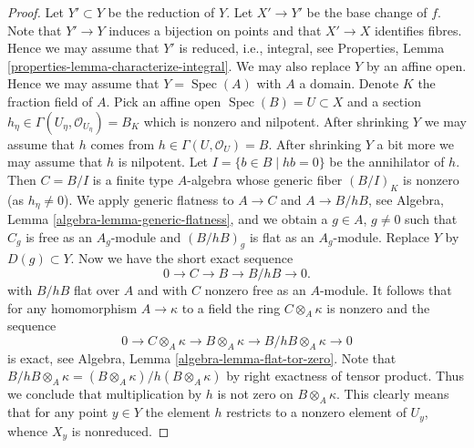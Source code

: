 \documentclass[10pt,a4paper]{amsart}
\theoremstyle{plain}
\theoremstyle{definition}
\theoremstyle{remark}
\numberwithin{equation}{subsection}
\def\Spec{\mathop{\mathrm{Spec}}}
\begin{document}
\begin{proof}
Let $Y' \subset Y$ be the reduction of $Y$. Let $X' \to Y'$
be the base change of $f$. Note that $Y' \to Y$
induces a bijection on points and that $X' \to X$ identifies fibres.
Hence we may assume that $Y'$ is reduced, i.e., integral, see
Properties, Lemma \ref{properties-lemma-characterize-integral}.
We may also replace $Y$ by an affine open. Hence we may assume that
$Y = \Spec(A)$ with $A$ a domain. Denote $K$ the
fraction field of $A$.
Pick an affine open $\Spec(B) = U \subset X$ and a section
$h_\eta \in \Gamma(U_\eta, \mathcal{O}_{U_\eta}) = B_K$
which is nonzero and nilpotent.
After shrinking $Y$ we may assume that $h$ comes from
$h \in \Gamma(U, \mathcal{O}_U) = B$. After shrinking $Y$ a bit
more we may assume that $h$ is nilpotent. Let
$I = \{b \in B \mid hb = 0\}$ be the annihilator of $h$.
Then $C = B/I$ is a finite type $A$-algebra whose generic fiber
$(B/I)_K$ is nonzero (as $h_\eta \not = 0$). We apply
generic flatness to $A \to C$ and $A \to B/hB$, see
Algebra, Lemma \ref{algebra-lemma-generic-flatness},
and we obtain a $g \in A$, $g \not = 0$ such that $C_g$ is free as
an $A_g$-module and $(B/hB)_g$ is flat as an $A_g$-module.
Replace $Y$ by $D(g) \subset Y$. Now we have the short exact sequence
$$
0 \to C \to B \to B/hB \to 0.
$$
with $B/hB$ flat over $A$ and with $C$ nonzero free as an $A$-module.
It follows that for any homomorphism $A \to \kappa$ to a field
the ring $C \otimes_A \kappa$ is nonzero and the sequence
$$
0 \to C \otimes_A \kappa \to B \otimes_A \kappa \to
B/hB \otimes_A \kappa \to 0
$$
is exact, see
Algebra, Lemma \ref{algebra-lemma-flat-tor-zero}.
Note that
$B/hB \otimes_A \kappa = (B \otimes_A \kappa) / h(B \otimes_A \kappa)$
by right exactness of tensor product. Thus we conclude that
multiplication by $h$ is not zero on $B \otimes_A \kappa$.
This clearly means that for any point $y \in Y$ the element $h$
restricts to a nonzero element of $U_y$, whence $X_y$ is nonreduced.
\end{proof}
\end{document}
